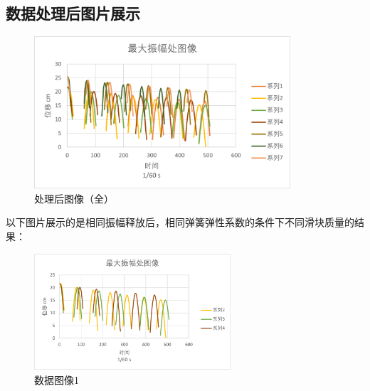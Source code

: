 \documentclass{ctexart}
\begin{document}
  \subsection{数据处理后图片展示}
  \begin{figure}[H]
    \centering
    \includegraphics[width=0.85\textwidth,height=0.6\textheight]{tuxiangquan.png}
    \caption{处理后图像（全）}
  \end{figure}
  \newpage
  以下图片展示的是相同振幅释放后，相同弹簧弹性系数的条件下不同滑块质量的结果：

  \begin{figure}[H]
    \centering
    \includegraphics[width=0.65\textwidth,height=0.35\textheight]{zhiliang1.png}
    \caption{数据图像1}
  \end{figure}
\end{document}

